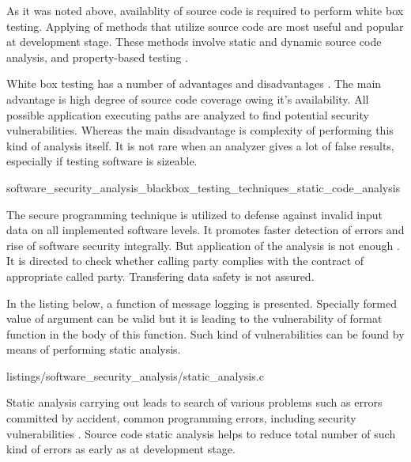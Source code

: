 %
As it was noted above, availablity of source code is required to perform white box testing. 
%
Applying of methods that utilize source code are most useful and popular at development stage. 
%
These methods involve static and dynamic source code analysis, and property-based testing . 

%
White box testing has a number of advantages and disadvantages . 
%
The main advantage is \A high degree of source code coverage owing it's availability. 
%
All possible application executing paths are analyzed to find potential security vulnerabilities. 
%
Whereas the main disadvantage is complexity of performing this kind of analysis itself. 
%
It is not rare when an analyzer gives a lot of false results, especially if testing software is sizeable. 


	{software_security_analysis_blackbox_testing_techniques_static_code_analysis}

%
The secure programming technique  is utilized to defense against invalid input data on all implemented software levels. 
%
It promotes faster detection of errors and rise of software security integrally. 
%
But application of the analysis is not enough . 
%
It is directed to check whether calling party complies with the contract of appropriate called party. 
%
Transfering data safety is not assured. 

%
In the listing below, a function of message logging is presented. 
%
Specially formed value of  argument can be valid but it is leading to the vulnerability of  format function in the body of this function. 
%
Such kind of vulnerabilities can be found by means of performing static analysis. 

	{listings/software_security_analysis/static_analysis.c}

%
Static analysis carrying out leads to search of various problems such as errors committed by accident, common programming errors, including security vulnerabilities . 
%
Source code static analysis helps to reduce \A total number of such kind of errors as early as at development stage. 

